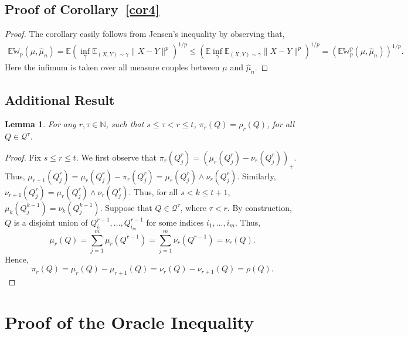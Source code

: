 \documentclass[12pts]{article}
\newtheorem{lemma}[defn]{Lemma}%
\newcommand{\sQ}{ \mathscr{Q}}
\newcommand{\hmu}{\hat{\mu}}
\newcommand{\E}{\mathbb{E}}
\newcommand{\fN}{\mathbb{N}}
\newcommand{\fW}{\mathbb{W}}
\begin{document}
\subsection{Proof of Corollary~\ref{cor4}}
\begin{proof}
     The corollary easily follows from Jensen's inequality by observing that,
     \begin{align*}
         \E \fW_p(\mu, \hmu_n)  =  \E \left( \inf_\gamma \E_{(X,Y) \sim \gamma} \|X-Y\|^p\right)^{1/p} 
         \le  \left( \E \inf_\gamma \E_{(X,Y) \sim \gamma} \|X-Y\|^p\right)^{1/p} 
         =  \left( \E \fW_p^p(\mu, \hmu_n)\right)^{1/p}.
     \end{align*}
     Here the infimum is taken over all measure couples between $\mu$ and $\hmu_n$.
 \end{proof}
\subsection{Additional Result}
 \begin{lemma}\label{lem:8}
      For any $r, \tau \in \fN$, such that $s \le \tau <  r \le t$, $\pi_r(Q) = \rho_r(Q)$, for all $Q \in \sQ^\tau$.
  \end{lemma}
  \begin{proof}
 Fix $ s \le r \le t $. We first observe that $\pi_r(Q^r_j) = (\mu_r(Q^r_j) - \nu_r(Q^r_j))_+$. Thus, $\mu_{r+1}(Q^r_j) = \mu_{r}(Q^r_j) - \pi_{r}(Q^r_j) = \mu_{r}(Q^r_j) \wedge \nu_{r}(Q^r_j)$. Similarly, $\nu_{r+1}(Q^r_j) = \mu_{r}(Q^r_j) \wedge \nu_{r}(Q^r_j)$. Thus, for all $s < k \le t+1$, $\mu_k(Q^{k-1}_j) = \nu_k(Q^{k-1}_j)$. Suppose that $Q \in \sQ^\tau$, where $\tau < r$. By construction, $Q$ is a disjoint union of $Q^{r-1}_{i_1}, \dots, Q_{i_m}^{r-1}$ for some indices $i_1, \dots, i_m$. Thus,
 \[\mu_r(Q) = \sum_{j = 1}^m \mu_r(Q^{r-1} ) = \sum_{j = 1}^m \nu_r(Q^{r-1} ) = \nu_r(Q). \]
 Hence, \[\pi_r(Q) = \mu_r(Q) - \mu_{r+1}(Q) = \nu_r(Q) - \nu_{r+1}(Q) = \rho(Q).\]
 \end{proof}
 \section{Proof of the Oracle Inequality}
 \label{ap_oracle}
\end{document}
